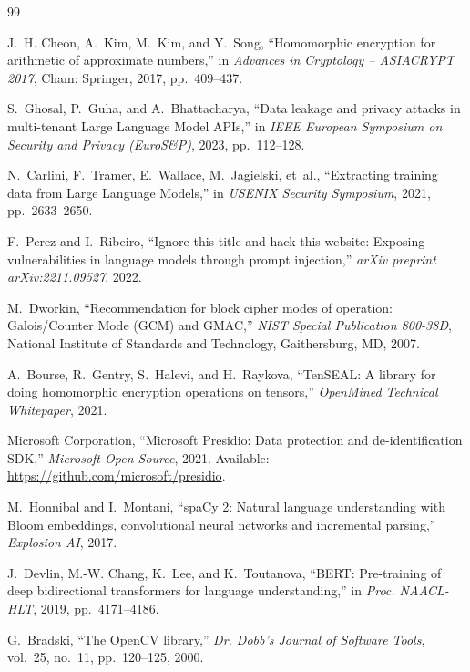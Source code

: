 \documentclass[12pt,a4paper,oneside]{report}
\numberwithin{equation}{chapter}
\begin{document}
\clearpage{}
\begin{thebibliography}{99}

J.~H. Cheon, A.~Kim, M.~Kim, and Y.~Song, ``Homomorphic encryption for arithmetic of approximate numbers,'' in \emph{Advances in Cryptology -- ASIACRYPT 2017}, Cham: Springer, 2017, pp.~409--437.

S.~Ghosal, P.~Guha, and A.~Bhattacharya, ``Data leakage and privacy attacks in multi-tenant Large Language Model APIs,'' in \emph{IEEE European Symposium on Security and Privacy (EuroS\&P)}, 2023, pp.~112--128.

N.~Carlini, F.~Tramer, E.~Wallace, M.~Jagielski, et~al., ``Extracting training data from Large Language Models,'' in \emph{USENIX Security Symposium}, 2021, pp.~2633--2650.

F.~Perez and I.~Ribeiro, ``Ignore this title and hack this website: Exposing vulnerabilities in language models through prompt injection,'' \emph{arXiv preprint arXiv:2211.09527}, 2022.

M.~Dworkin, ``Recommendation for block cipher modes of operation: Galois/Counter Mode (GCM) and GMAC,'' \emph{NIST Special Publication 800-38D}, National Institute of Standards and Technology, Gaithersburg, MD, 2007.

A.~Bourse, R.~Gentry, S.~Halevi, and H.~Raykova, ``TenSEAL: A library for doing homomorphic encryption operations on tensors,'' \emph{OpenMined Technical Whitepaper}, 2021.

Microsoft Corporation, ``Microsoft Presidio: Data protection and de-identification SDK,'' \emph{Microsoft Open Source}, 2021. Available: \url{https://github.com/microsoft/presidio}.

M.~Honnibal and I.~Montani, ``spaCy 2: Natural language understanding with Bloom embeddings, convolutional neural networks and incremental parsing,'' \emph{Explosion AI}, 2017.

J.~Devlin, M.-W. Chang, K.~Lee, and K.~Toutanova, ``BERT: Pre-training of deep bidirectional transformers for language understanding,'' in \emph{Proc. NAACL-HLT}, 2019, pp.~4171--4186.

G.~Bradski, ``The OpenCV library,'' \emph{Dr. Dobb's Journal of Software Tools}, vol.~25, no.~11, pp.~120--125, 2000.


\end{thebibliography}
\end{document}
